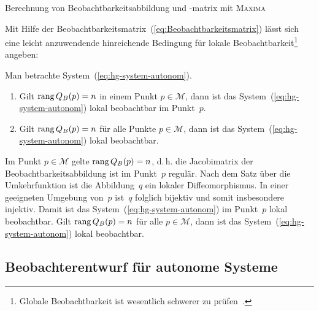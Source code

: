 \begin{algorithm}


\caption{Berechnung von Beobachtbarkeitsabbildung und -matrix mit \textsc{Maxima}\label{alg:Berechnung-Beobachtbarkeitsmatrix}}
\end{algorithm}

Mit Hilfe der Beobachtbarkeitsmatrix~(\ref{eq:Beobachtbarkeitsmatrix})
lässt sich eine leicht anzuwendende hinreichende Bedingung für lokale
Beobachtbarkeit\footnote{Globale Beobachtbarkeit ist wesentlich schwerer zu prüfen~\cite{tibken2004cdc,bartosiewicz1995local}.}
angeben: 
\begin{lemma}
\label{lem:Beobachtbarkeit-hinreichende-Bedingung}Man betrachte System~(\ref{eq:hg-system-autonom}). 
\begin{enumerate}
\item Gilt ${\operatorname{rang}}\,Q_{B}(p)=n$ in einem Punkt $p\in\mathcal{M}$, dann
ist das System~(\ref{eq:hg-system-autonom}) lokal beobachtbar im
Punkt~$p$.
\item Gilt ${\operatorname{rang}}\,Q_{B}(p)=n$ für alle Punkte $p\in\mathcal{M}$, dann
ist das System~(\ref{eq:hg-system-autonom}) lokal beobachtbar.
\end{enumerate}
\end{lemma}
\begin{svmultproof2}
Im Punkt $p\in\mathcal{M}$ gelte ${\operatorname{rang}}\,Q_{B}(p)=n$, d.\,h. die
Jacobimatrix der Beobachtbarkeitsabbildung ist im Punkt~$p$ regulär.
Nach dem Satz über die Umkehrfunktion ist die Abbildung~$q$ ein
lokaler Diffeomorphismus. In einer geeigneten Umgebung von~$p$ ist~$q$
folglich bijektiv und somit insbesondere injektiv. Damit ist das System~(\ref{eq:hg-system-autonom})
im Punkt~$p$ lokal beobachtbar. Gilt ${\operatorname{rang}}\,Q_{B}(p)=n$ für alle
$p\in\mathcal{M}$, dann ist das System~(\ref{eq:hg-system-autonom})
lokal beobachtbar.
\end{svmultproof2}


\subsection{Beobachterentwurf für autonome Systeme\label{subsec:Beobachterentwurf-autonom}}

